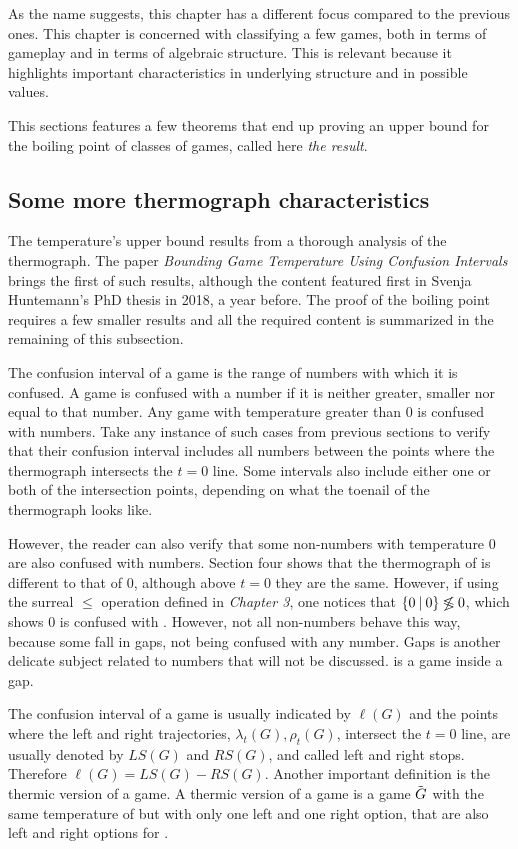 As the name suggests, this chapter has a different focus compared to the previous ones. This chapter is concerned with classifying a few games, both in terms of gameplay and in terms of algebraic structure. This is relevant because it highlights important characteristics in underlying structure and in possible values.

This sections features a few theorems that end up proving an upper bound for the boiling point of classes of games, called here \textit{the result}.

\subsection*{Some more thermograph characteristics}

The temperature's upper bound results from a thorough analysis of the thermograph. The paper \textit{Bounding Game Temperature Using Confusion
Intervals} \cite{12} brings the first of such results, although the content featured first in Svenja Huntemann's PhD thesis \cite{5} in 2018, a year before. The proof of the boiling point requires a few smaller results and all the required content is summarized in the remaining of this subsection.

The confusion interval of a game is the range of numbers with which it is confused. A game is confused with a number if it is neither greater, smaller nor equal to that number. Any game with temperature greater than 0 is confused with numbers. Take any instance of such cases from previous sections to verify that their confusion interval includes all numbers between the points where the thermograph intersects the $t=0$ line. Some intervals also include either one or both of the intersection points, depending on what the toenail of the thermograph looks like.

However, the reader can also verify that some non-numbers with temperature 0 are also confused with numbers. Section four shows that the thermograph of  is different to that of 0, although above $t=0$ they are the same. However, if using the surreal $\leq$ operation defined in \textit{Chapter 3}, one notices that $\mbox{$\{0\:|\:0\}$} \not\lessgtr 0$, which shows $0$ is confused with . However, not all non-numbers behave this way, because some fall in gaps, not being confused with any number. Gaps is another delicate subject related to numbers that will not be discussed.  is a game inside a gap.

The confusion interval of a game \Gm{} is usually indicated by $\ell(G)$ and the points where the left and right trajectories, $\lambda_t(G), \rho_t(G)$, intersect the $t=0$ line, are usually denoted by $LS(G)$ and $RS(G)$, and called left and right stops. Therefore $\ell(G) = LS(G)-RS(G)$. Another important definition is the thermic version of a game. A thermic version of a game \Gm{} is a game $\tilde{\mbox{$G$}}$ with the same temperature of \Gm{} but with only one left and one right option, that are also left and right options for \Gm{}.


